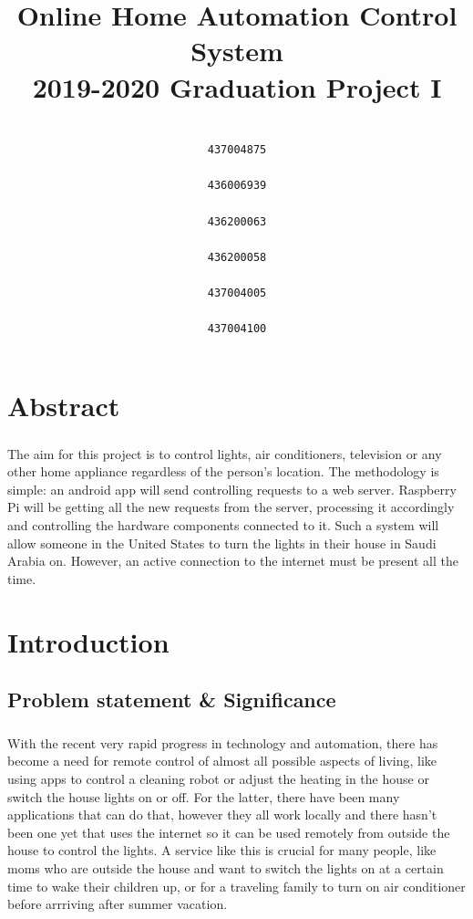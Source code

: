 \documentclass[a4paper, 12pt, oneside]{book}
\date{}
\title{
	\color{section}
	Online Home Automation Control System \\
		\color{ssub}\large 2019-2020 Graduation Project I }
\author{
	\setcode{utf8}
	\RL{ريم علي الغامدي} 
	\\\texttt{437004875}
	\\[3ex]
	\RL{ساره خالد آل حسين} 
	\\\texttt{436006939}
	\\[3ex]
	\RL{ضحى نضال الزعبي} 
	\\\texttt{436200063}
	\\[3ex]
	\RL{عبير أحمد عزت} 
	\\\texttt{436200058}
	\\[3ex]
	\RL{منى سعود الخثلان} 
	\\\texttt{437004005}
	\\[3ex]
	\RL{نوف عبد الله الدعجاني} 
	\\\texttt{437004100}
}
\begin{document}
	
	
	\maketitle
	\newpage

	
	\tableofcontents
	\newpage	
	\doublespacing
	\newpage
	
	\listoftables
	\newpage
	
	\listoffigures
	\newpage
	




	\chapter*{Abstract}
		\label{sec:intro}
	\paragraph{} The aim for this project is to control lights, air conditioners, television or any other home appliance regardless of the person's location. The methodology is simple: an android app will send controlling requests to a web server. Raspberry Pi will be getting all the new requests from the server, processing it accordingly and controlling the hardware components connected to it. Such a system will allow someone in the United States to turn the lights in their house in Saudi Arabia on. However, an active connection to the internet must be present all the time.
	
	

	\chapter{Introduction}
		\section{Problem statement \& Significance}
		\paragraph{}With the recent very rapid progress in technology and automation, there has become a need for remote control of almost all possible aspects of living, like using apps to control a cleaning robot or adjust the heating in the house or switch the house lights on or off. For the latter, there have been many applications that can do that, however they all work locally and there hasn’t been one yet that uses the internet so it can be used remotely from outside the house to control the lights. A service like this is crucial for many people, like moms who are outside the house and want to switch the lights on at a certain time to wake their children up, or for a traveling family to turn on air conditioner before arrriving after summer vacation.
\end{document}
